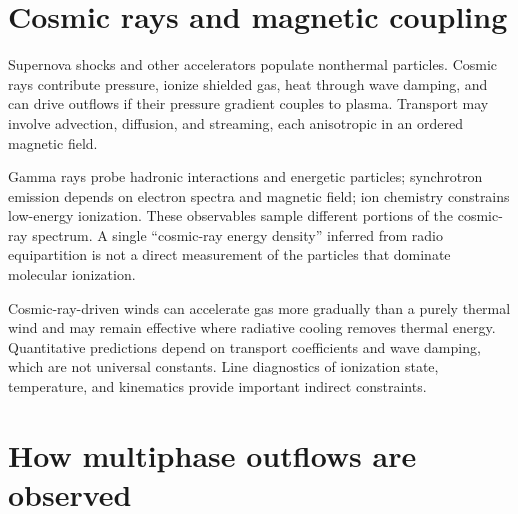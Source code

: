 \section{Cosmic rays and magnetic coupling}

Supernova shocks and other accelerators populate nonthermal particles.  Cosmic rays
contribute pressure, ionize shielded gas, heat through wave damping, and can drive
outflows if their pressure gradient couples to plasma.  Transport may involve
advection, diffusion, and streaming, each anisotropic in an ordered magnetic field.

Gamma rays probe hadronic interactions and energetic particles; synchrotron emission
depends on electron spectra and magnetic field; ion chemistry constrains low-energy
ionization.  These observables sample different portions of the cosmic-ray spectrum.
A single ``cosmic-ray energy density'' inferred from radio equipartition is not a
direct measurement of the particles that dominate molecular ionization.

Cosmic-ray-driven winds can accelerate gas more gradually than a purely thermal wind
and may remain effective where radiative cooling removes thermal energy.  Quantitative
predictions depend on transport coefficients and wave damping, which are not universal
constants.  Line diagnostics of ionization state, temperature, and kinematics provide
important indirect constraints.

\section{How multiphase outflows are observed}

